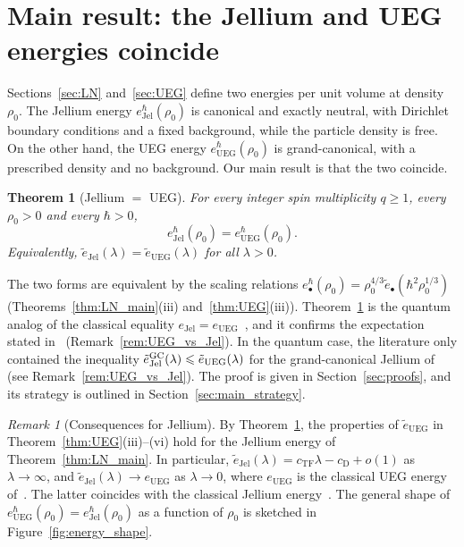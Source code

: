 \documentclass[final,reqno]{amsart}
\newtheorem{theorem}{Theorem}[section]
\theoremstyle{remark}
\newtheorem{remark}{Remark}
\theoremstyle{definition}
\renewcommand{\le}{\leqslant}
\renewcommand{\ge}{\geqslant}
\newcommand{\TF}{\mathrm{TF}}
\newcommand{\UEG}{\mathrm{UEG}}
\newcommand{\Jel}{\mathrm{Jel}}
\begin{document}
\section{Main result: the Jellium and UEG energies coincide}\label{sec:main}

Sections~\ref{sec:LN} and~\ref{sec:UEG} define two energies per unit volume at density $\rho_0$. The Jellium energy $e^\hbar_\Jel(\rho_0)$ is canonical and exactly neutral, with Dirichlet boundary conditions and a fixed background, while the particle density is free. On the other hand, the UEG energy $e^\hbar_\UEG(\rho_0)$ is grand-canonical, with a prescribed density and no background. Our main result is that the two coincide.

\begin{theorem}[Jellium $=$ UEG]\label{thm:main}
For every integer spin multiplicity $q\ge1$, every $\rho_0>0$ and every $\hbar>0$,
\begin{equation}\label{eq:main}
e^\hbar_\Jel(\rho_0)=e^\hbar_\UEG(\rho_0).
\end{equation}
Equivalently, $\tilde e_\Jel(\lambda)=\tilde e_\UEG(\lambda)$ for all $\lambda>0$.
\end{theorem}

The two forms are equivalent by the scaling relations $e^\hbar_\bullet(\rho_0)=\rho_0^{4/3}\tilde e_\bullet(\hbar^2\rho_0^{1/3})$ (Theorems~\ref{thm:LN_main}(iii) and~\ref{thm:UEG}(iii)). Theorem~\ref{thm:main} is the quantum analog of the classical equality $e_\Jel=e_\UEG$~\cite{lewin2019floating,cotar2017equality}, and it confirms the expectation stated in~\cite[Sec.~2.2]{lewin2020local} (Remark~\ref{rem:UEG_vs_Jel}). In the quantum case, the literature only contained the inequality $\tilde e^{\rm GC}_\Jel(\lambda)\le\tilde e_\UEG(\lambda)$ for the grand-canonical Jellium of~\cite{lewin2018statistical} (see Remark~\ref{rem:UEG_vs_Jel}). The proof is given in Section~\ref{sec:proofs}, and its strategy is outlined in Section~\ref{sec:main_strategy}.

\begin{remark}[Consequences for Jellium]\label{rem:main_consequences}
By Theorem~\ref{thm:main}, the properties of $\tilde e_\UEG$ in Theorem~\ref{thm:UEG}(iii)--(vi) hold for the Jellium energy of Theorem~\ref{thm:LN_main}. In particular, $\tilde e_\Jel(\lambda)=c_\TF\lambda-c_{\mathrm D}+o(1)$ as $\lambda\to\infty$, and $\tilde e_\Jel(\lambda)\to e_\UEG$ as $\lambda\to0$, where $e_\UEG$ is the classical UEG energy of~\cite[Thm.~2.6]{lewin2018statistical}. The latter coincides with the classical Jellium energy~\cite{lewin2019floating,cotar2017equality}. The general shape of $e^\hbar_\UEG(\rho_0)=e^\hbar_\Jel(\rho_0)$ as a function of $\rho_0$ is sketched in Figure~\ref{fig:energy_shape}.
\end{remark}
\end{document}
